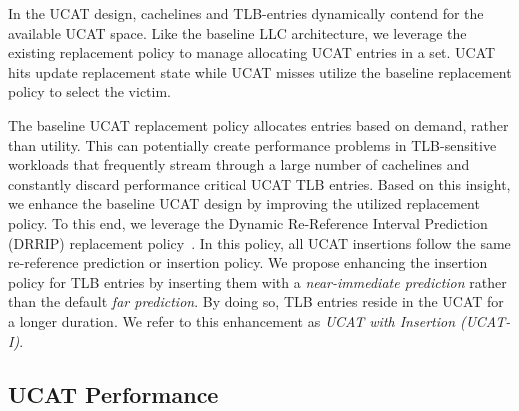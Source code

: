 In the UCAT design, cachelines and TLB-entries dynamically contend for
the available UCAT space. Like the baseline LLC architecture, we
leverage the existing replacement policy to manage allocating UCAT
entries in a set. UCAT hits update replacement state while UCAT misses
utilize the baseline replacement policy to select the victim.

The baseline UCAT replacement policy allocates entries based on
demand, rather than utility. This can potentially create performance
problems in TLB-sensitive workloads that frequently stream through a
large number of cachelines and constantly discard performance critical
UCAT TLB entries. Based on this insight, we enhance the baseline UCAT
design by improving the utilized replacement policy. To this end, we
leverage the Dynamic Re-Reference Interval Prediction (DRRIP)
replacement policy~\cite{jaleel_rrip}. In this policy, all UCAT
insertions follow the same re-reference prediction or insertion
policy. We propose enhancing the insertion policy for TLB entries by
inserting them with a {\em near-immediate prediction} rather than the
default {\em far prediction}. By doing so, TLB entries reside in the
UCAT for a longer duration. We refer to this enhancement as {\em UCAT
with Insertion (UCAT-I)}.

% 
% 

\subsection{UCAT Performance}

